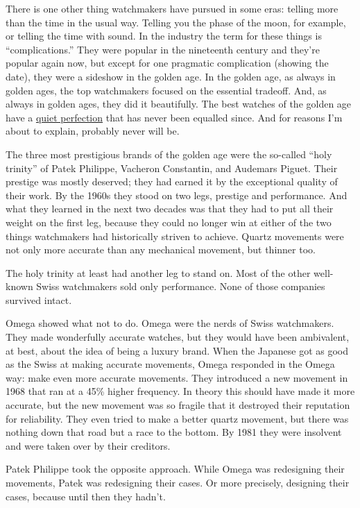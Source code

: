 There is one other thing watchmakers have pursued in some eras: telling
more than the time in the usual way. Telling you the phase of the moon,
for example, or telling the time with sound. In the industry the term
for these things is ``complications.'' They were popular in the
nineteenth century and they're popular again now, but except for one
pragmatic complication (showing the date), they were a sideshow in the
golden age. In the golden age, as always in golden ages, the top
watchmakers focused on the essential tradeoff. And, as always in golden
ages, they did it beautifully. The best watches of the golden age have a
\href{https://goldammer.me/products/vacheron-constantin-18k-white-gold}{quiet
perfection} that has never been equalled since. And for reasons I'm
about to explain, probably never will be.

The three most prestigious brands of the golden age were the so-called
``holy trinity'' of Patek Philippe, Vacheron Constantin, and Audemars
Piguet. Their prestige was mostly deserved; they had earned it by the
exceptional quality of their work. By the 1960s they stood on two legs,
prestige and performance. And what they learned in the next two decades
was that they had to put all their weight on the first leg, because they
could no longer win at either of the two things watchmakers had
historically striven to achieve. Quartz movements were not only more
accurate than any mechanical movement, but thinner too.

The holy trinity at least had another leg to stand on. Most of the other
well-known Swiss watchmakers sold only performance. None of those
companies survived intact.

Omega showed what not to do. Omega were the nerds of Swiss watchmakers.
They made wonderfully accurate watches, but they would have been
ambivalent, at best, about the idea of being a luxury brand. When the
Japanese got as good as the Swiss at making accurate movements, Omega
responded in the Omega way: make even more accurate movements. They
introduced a new movement in 1968 that ran at a 45\% higher frequency.
In theory this should have made it more accurate, but the new movement
was so fragile that it destroyed their reputation for reliability. They
even tried to make a better quartz movement, but there was nothing down
that road but a race to the bottom. By 1981 they were insolvent and were
taken over by their creditors.

Patek Philippe took the opposite approach. While Omega was redesigning
their movements, Patek was redesigning their cases. Or more precisely,
designing their cases, because until then they hadn't.


